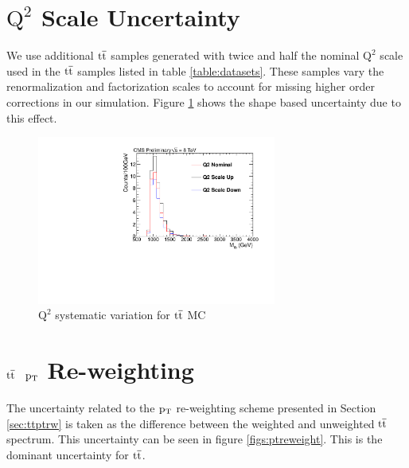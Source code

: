 
\section{$\mathrm{Q^2}$ Scale Uncertainty}
We use additional $\mathrm{t\overline{t}}$ samples generated with twice and half the nominal $\mathrm{Q^2}$ 
scale used in the $\mathrm{t\overline{t}}$ samples listed in table \ref{table:datasets}.  These samples vary the renormalization and factorization scales to account for 
missing higher order corrections in our simulation.  Figure \ref{figs:q2scale} shows the shape based uncertainty due to this effect.

\begin{figure}[htcb]
\begin{center}
\includegraphics[width=0.7\textwidth]{AN-13-004/figs/TTbar_Q2Scale}
\caption{
$\mathrm{Q^2}$ systematic variation for $\mathrm{t\overline{t}}$ MC 
}
\label{figs:q2scale}
\end{center}
\end{figure}

\section{$\mathrm{t\overline{t}}$ $\mathrm{p_{T}}$ Re-weighting}
The uncertainty related to the $\mathrm{p_{T}}$ re-weighting scheme presented in Section \ref{sec:ttptrw} is taken as the difference between the weighted and unweighted $\mathrm{t\overline{t}}$ spectrum.
This uncertainty can be seen in figure \ref{figs:ptreweight}.  This is the dominant uncertainty for $\mathrm{t\overline{t}}$. 

